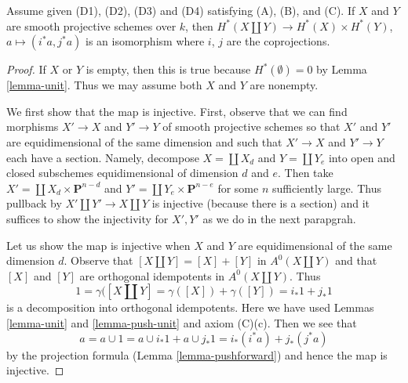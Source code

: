 \begin{lemma}
\label{lemma-weil-additive}
Assume given (D1), (D2), (D3) and (D4) satisfying (A), (B), and (C).
If $X$ and $Y$ are smooth projective schemes over $k$, then
$H^*(X \amalg Y) \to H^*(X) \times H^*(Y)$,
$a \mapsto (i^*a, j^*a)$ is an isomorphism where $i$, $j$
are the coprojections.
\end{lemma}

\begin{proof}
If $X$ or $Y$ is empty, then this is true because
$H^*(\emptyset) = 0$ by Lemma \ref{lemma-unit}.
Thus we may assume both $X$ and $Y$ are nonempty.

\medskip\noindent
We first show that the map is injective. First, observe that
we can find morphisms $X' \to X$ and $Y' \to Y$
of smooth projective schemes so that $X'$ and $Y'$ are
equidimensional of the same dimension and such that
$X' \to X$ and $Y' \to Y$ each have a section. Namely,
decompose $X = \coprod X_d$ and $Y = \coprod Y_e$
into open and closed subschemes equidimensional of
dimension $d$ and $e$. Then take
$X' = \coprod X_d \times \mathbf{P}^{n - d}$
and $Y' = \coprod Y_e \times \mathbf{P}^{n - e}$ for some
$n$ sufficiently large. Thus pullback by
$X' \amalg Y' \to X \amalg Y$ is injective
(because there is a section) and
it suffices to show the injectivity for $X', Y'$
as we do in the next parapgrah.

\medskip\noindent
Let us show the map is injective when $X$ and $Y$ are equidimensional
of the same dimension $d$.
Observe that $[X \amalg Y] = [X] + [Y]$ in $A^0(X \amalg Y)$
and that $[X]$ and $[Y]$ are orthogonal idempotents in $A^0(X \amalg Y)$.
Thus
$$
1 = \gamma([X \amalg Y] = \gamma([X]) + \gamma([Y]) = i_*1 + j_*1
$$
is a decomposition into orthogonal idempotents. Here we have used
Lemmas \ref{lemma-unit} and \ref{lemma-push-unit} and axiom (C)(c).
Then we see that
$$
a = a \cup 1 = a \cup i_*1 + a \cup j_*1 =
i_*(i^*a) + j_*(j^*a)
$$
by the projection formula (Lemma \ref{lemma-pushforward}) and hence the map
is injective.


\end{proof}
